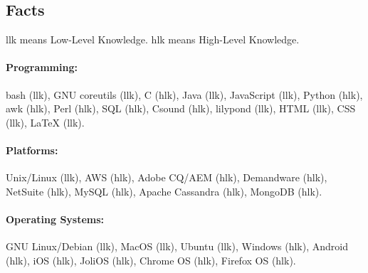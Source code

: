 \subsection{
Facts
}
llk means Low-Level Knowledge. hlk means High-Level Knowledge.

\paragraph{
Programming:
}
bash (llk), GNU coreutils (llk), C (hlk), Java (llk), JavaScript (llk), Python 
(hlk), awk (hlk), 
Perl 
(hlk), SQL (hlk), Csound (hlk), lilypond (llk), HTML (llk), CSS (llk), LaTeX 
(llk).

\paragraph{
Platforms:
}
Unix/Linux (llk), AWS (hlk), Adobe CQ/AEM (hlk), Demandware (hlk), NetSuite 
(hlk), MySQL (hlk), Apache Cassandra (hlk), MongoDB (hlk).

\paragraph{
Operating Systems:
}
GNU Linux/Debian (llk), MacOS (llk), Ubuntu (llk), Windows (hlk), Android (hlk), 
iOS (hlk), 
JoliOS (hlk), Chrome OS (hlk), Firefox OS (hlk).
